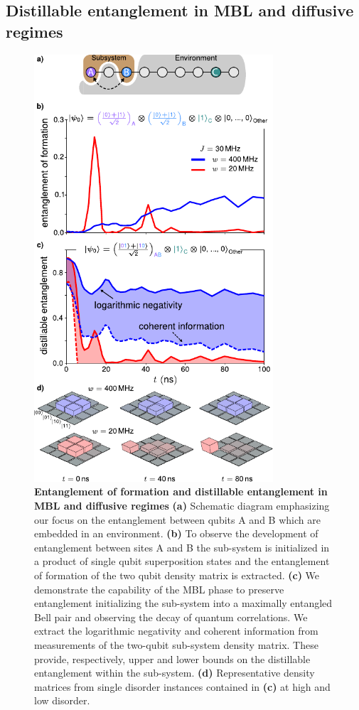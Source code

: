 \subsection{Distillable entanglement in MBL and diffusive regimes}
\begin{figure}[h]
\centering
\includegraphics[width=89mm, keepaspectratio]{./PDF/f6_190716_1129a.pdf}
\caption{\textbf{Entanglement of formation and distillable entanglement in MBL and diffusive regimes}\footnotesize{
        \textbf{(a)} Schematic diagram emphasizing our focus on the entanglement between qubits A and B which are embedded in an environment.
        \textbf{(b)} To observe the development of entanglement between sites A and B the sub-system is initialized in a product of single qubit superposition states and the entanglement of formation of the two qubit density matrix is extracted.
        \textbf{(c)} We demonstrate the capability of the MBL phase to preserve entanglement initializing the sub-system into a maximally entangled Bell pair and observing the decay of quantum correlations.
        We extract the logarithmic negativity and coherent information from measurements of the two-qubit sub-system density matrix.
        These provide, respectively, upper and lower bounds on the distillable entanglement within the sub-system.
        \textbf{(d)} Representative density matrices from single disorder instances contained in \textbf{(c)} at high and low disorder.
        }
}
\label{eof_and_de_1d_array}
\end{figure}

